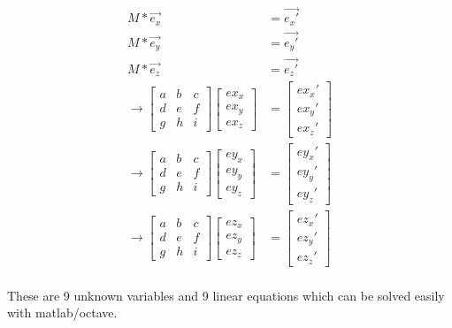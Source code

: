 \begin{align*}
M*\vec{e_x}&=\vec{e_x'}\\
M*\vec{e_y}&=\vec{e_y'}\\
M*\vec{e_z}&=\vec{e_z'}\\
\rightarrow 
\begin{bmatrix}
a & b & c\\ d & e & f\\ g & h & i
\end{bmatrix}
\begin{bmatrix}ex_x\\ex_y\\ex_z\end{bmatrix} &= \begin{bmatrix}ex_{x}'\\ex_{y}'\\ex_{z}'\end{bmatrix}\\
\rightarrow 
\begin{bmatrix}
a & b & c\\ d & e & f\\ g & h & i
\end{bmatrix}
\begin{bmatrix}ey_x\\ey_y\\ey_z\end{bmatrix} &= \begin{bmatrix}ey_{x}'\\ey_{y}'\\ey_{z}'\end{bmatrix}\\
\rightarrow 
\begin{bmatrix}
a & b & c\\ d & e & f\\ g & h & i
\end{bmatrix}
\begin{bmatrix}ez_x\\ez_y\\ez_z\end{bmatrix} &= \begin{bmatrix}ez_{x}'\\ez_{y}'\\ez_{z}'\end{bmatrix}\\
\end{align*}  

These are 9 unknown variables and 9 linear equations which can be solved easily with matlab/octave.

